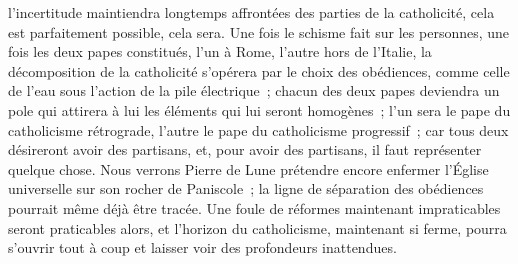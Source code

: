 \documentclass[french,twoside]{book} %
\begin{document}
l’incertitude maintiendra longtemps affrontées des parties de la catholicité, cela est parfaitement possible, cela sera. Une fois le schisme fait sur les personnes, une fois les deux papes constitués, l’un à Rome, l’autre hors de l’Italie, la décomposition de la catholicité s’opérera par le choix des obédiences, comme celle de l’eau sous l’action de la pile électrique ; chacun des deux papes deviendra un pole qui attirera à lui les éléments qui lui seront homogènes ; l’un sera le pape du catholicisme rétrograde, l’autre le pape du catholicisme progressif ; car tous deux désireront avoir des partisans, et, pour avoir des partisans, il faut représenter quelque chose. Nous verrons Pierre de Lune prétendre encore enfermer l’Église universelle sur son rocher de Paniscole ; la ligne de séparation des obédiences pourrait même déjà être tracée. Une foule de réformes maintenant impraticables seront praticables alors, et l’horizon du catholicisme, maintenant si ferme, pourra s’ouvrir tout à coup et laisser voir des profondeurs inattendues.
\end{document}
